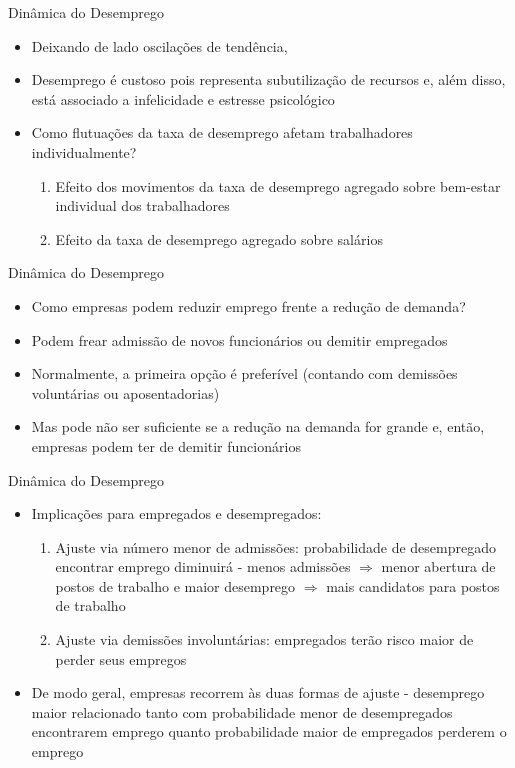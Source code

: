 \documentclass[10pt]{beamer}
\begin{document}
\begin{frame}{Dinâmica do Desemprego}
    \begin{itemize}
        \item Deixando de lado oscilações de tendência, \bigskip
        \item Desemprego é custoso pois representa subutilização de recursos e, além disso, está associado a infelicidade e estresse psicológico\bigskip
        \item Como flutuações da taxa de desemprego afetam trabalhadores individualmente?\medskip
        \begin{enumerate}
            \item Efeito dos movimentos da taxa de desemprego agregado sobre bem-estar individual dos trabalhadores\medskip
            \item Efeito da taxa de desemprego agregado sobre salários
        \end{enumerate}
    \end{itemize}
\end{frame}

\begin{frame}{Dinâmica do Desemprego}
    \begin{itemize}
        \item Como empresas podem reduzir emprego frente a redução de demanda?\bigskip
        \item Podem frear admissão de novos funcionários ou demitir empregados\bigskip
        \item Normalmente, a primeira opção é preferível (contando com demissões voluntárias ou aposentadorias)\bigskip
        \item Mas pode não ser suficiente se a redução na demanda for grande e, então, empresas podem ter de demitir funcionários
    \end{itemize}
\end{frame}

\begin{frame}{Dinâmica do Desemprego}
    \begin{itemize}
        \item Implicações para empregados e desempregados:\medskip
        \begin{enumerate}
            \item Ajuste via número menor de admissões: probabilidade de desempregado encontrar emprego diminuirá - menos admissões $\Rightarrow$ menor abertura de postos de trabalho e maior desemprego $\Rightarrow$ mais candidatos para postos de trabalho\medskip
            \item Ajuste via demissões involuntárias: empregados terão risco maior de perder seus empregos\bigskip
        \end{enumerate}
        \item De modo geral, empresas recorrem às duas formas de ajuste - desemprego maior relacionado tanto com probabilidade menor de desempregados encontrarem emprego quanto probabilidade maior de empregados perderem o emprego
    \end{itemize}
\end{frame}
\end{document}
